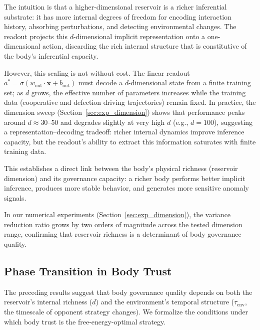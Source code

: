 \documentclass[11pt,a4paper]{article}
\theoremstyle{definition}
\newcommand{\Wout}{w_{\mathrm{out}}}
\newcommand{\xstate}{\mathbf{x}}
\newcommand{\abody}{a^{*}}
\newcommand{\bout}{b_{\mathrm{out}}}
\begin{document}
The intuition is that a higher-dimensional reservoir is a richer
inferential substrate: it has more internal degrees of freedom for
encoding interaction history, absorbing perturbations, and detecting
environmental changes.  The readout projects this $d$-dimensional
implicit representation onto a one-dimensional action, discarding the
rich internal structure that is constitutive of the body's
inferential capacity.

However, this scaling is not without cost.  The linear readout
$\abody = \sigma(\Wout \cdot \xstate + \bout)$ must decode a
$d$-dimensional state from a finite training set; as $d$ grows, the
effective number of parameters increases while the training data
(cooperative and defection driving trajectories) remain fixed.
In practice, the dimension sweep (Section~\ref{sec:exp_dimension})
shows that performance peaks around $d \approx 30$--$50$ and
degrades slightly at very high $d$ (e.g., $d = 100$), suggesting
a representation--decoding tradeoff: richer internal dynamics improve
inference capacity, but the readout's ability to extract this
information saturates with finite training data.

This establishes a direct link between the body's physical richness
(reservoir dimension) and its governance capacity: a richer body
performs better implicit inference, produces more stable behavior,
and generates more sensitive anomaly signals.

In our numerical experiments (Section~\ref{sec:exp_dimension}), the
variance reduction ratio grows by two orders of magnitude across the
tested dimension range, confirming that reservoir richness is a
determinant of body governance quality.

\subsection{Phase Transition in Body Trust}
\label{sec:phase_transition}

The preceding results suggest that body governance quality depends on both
the reservoir's internal richness ($d$) and the environment's temporal
structure ($\tau_{\mathrm{env}}$, the timescale of opponent strategy changes).
We formalize the conditions under which body trust is the free-energy-optimal
strategy.
\end{document}
